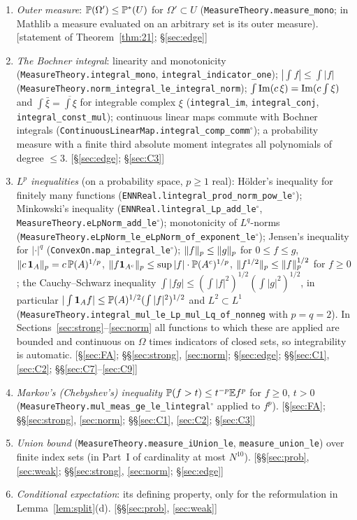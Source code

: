 \begin{enumerate}[leftmargin=2em,itemsep=1pt]
\item \emph{Outer measure}: $\mathbb{P}(\Omega')\le\mathbb{P}^*(U)$ for $\Omega'\subset U$ (\texttt{MeasureTheory.measure\_mono}; in Mathlib a measure evaluated on an arbitrary set is its outer measure).
\hfill[statement of Theorem~\ref{thm:21}; \S\ref{sec:edge}]
\item \emph{The Bochner integral}: linearity and monotonicity (\texttt{MeasureTheory.integral\_mono}, \texttt{integral\_indicator\_one}); $|\int f|\le\int|f|$ (\texttt{MeasureTheory.norm\_integral\_le\_integral\_norm});
$\int\operatorname{Im}(c\,\xi)=\operatorname{Im}(c\int\xi)$ and $\int\bar\xi=\overline{\int\xi}$ for integrable complex $\xi$ (\texttt{integral\_im}, \texttt{integral\_conj}, \texttt{integral\_const\_mul}); continuous linear maps commute with
Bochner integrals (\texttt{ContinuousLinearMap.integral\_comp\_comm}$^\circ$); a probability measure with a finite third absolute moment integrates all polynomials of degree $\le3$.
\hfill[\S\ref{sec:edge}; \S\ref{sec:C3}]
\item \emph{$L^p$ inequalities} (on a probability space, $p\ge1$ real): H\"older's inequality for finitely many functions (\texttt{ENNReal.lintegral\_prod\_norm\_pow\_le}$^\circ$); Minkowski's inequality
(\texttt{ENNReal.lintegral\_Lp\_add\_le}$^\circ$, \texttt{MeasureTheory.eLpNorm\_add\_le}$^\circ$); monotonicity of $L^q$-norms (\texttt{MeasureTheory.eLpNorm\_le\_eLpNorm\_of\_exponent\_le}$^\circ$);
Jensen's inequality for $|\cdot|^q$ (\texttt{ConvexOn.map\_integral\_le}$^\circ$); $\|f\|_p\le\|g\|_p$ for $0\le f\le g$, $\|c\,\mathbf{1}_A\|_p=c\,\mathbb{P}(A)^{1/p}$, $\|f\mathbf{1}_{A^c}\|_p\le\sup|f|\cdot\mathbb{P}(A^c)^{1/p}$,
$\|f^{1/2}\|_p\le\|f\|_p^{1/2}$ for $f\ge0$; the Cauchy--Schwarz inequality $\int|fg|\le(\int|f|^2)^{1/2}(\int|g|^2)^{1/2}$, in particular $|\int\mathbf{1}_Af|\le\mathbb{P}(A)^{1/2}(\int|f|^2)^{1/2}$ and
$L^2\subset L^1$ (\texttt{MeasureTheory.integral\_mul\_le\_Lp\_mul\_Lq\_of\_nonneg} with $p=q=2$). In Sections~\ref{sec:strong}--\ref{sec:norm} all functions to which these are applied are bounded
and continuous on $\Omega$ times indicators of closed sets, so integrability is automatic. \hfill[\S\ref{sec:FA}; \S\S\ref{sec:strong}, \ref{sec:norm}; \S\ref{sec:edge}; \S\S\ref{sec:C1}, \ref{sec:C2}; \S\S\ref{sec:C7}--\ref{sec:C9}]
\item \emph{Markov's (Chebyshev's) inequality} $\mathbb{P}(f>t)\le t^{-p}\mathbb{E} f^p$ for $f\ge0$, $t>0$ (\texttt{MeasureTheory.mul\_meas\_ge\_le\_lintegral}$^\circ$ applied to $f^p$). \hfill[\S\ref{sec:FA}; \S\S\ref{sec:strong}, \ref{sec:norm}; \S\S\ref{sec:C1}, \ref{sec:C2}; \S\ref{sec:C3}]
\item \emph{Union bound} (\texttt{MeasureTheory.measure\_iUnion\_le}, \texttt{measure\_union\_le}) over finite index sets (in Part~I of cardinality at most $N^{10}$). \hfill[\S\S\ref{sec:prob}, \ref{sec:weak}; \S\S\ref{sec:strong}, \ref{sec:norm}; \S\ref{sec:edge}]
\item \emph{Conditional expectation}: its defining property, only for the reformulation in Lemma~\ref{lem:split}(d). \hfill[\S\S\ref{sec:prob}, \ref{sec:weak}]
\end{enumerate}

